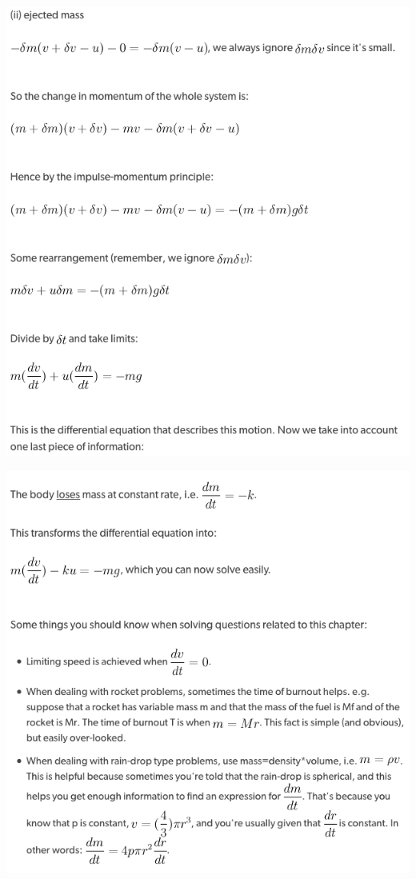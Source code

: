 \documentclass[a4paper]{article}
\begin{document}
\begin{center}
    \includegraphics[scale=0.5]{img_M/22_eg2}
\end{center}
\begin{center}
    \includegraphics[scale=0.5]{img_M/22_eg3}
\end{center}
\end{document}
